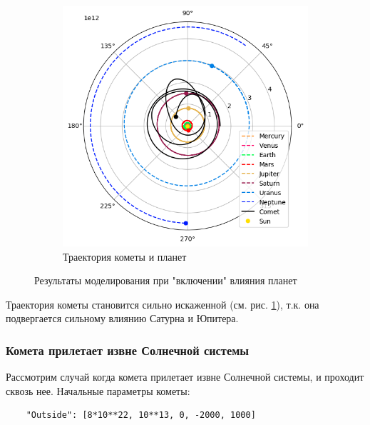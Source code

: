 \begin{figure}[H]
\begin{subfigure}{0.49\linewidth}
		\includegraphics[width=1\linewidth]{imgs_8/trj.png}
		\caption{Траектория кометы и планет}
    \end{subfigure}
    \caption{Результаты моделирования при "включении" влияния планет}
    \label{fig:default}
\end{figure}
Траектория кометы становится сильно искаженной (см. рис. \ref{fig:default}), т.к. она подвергается сильному влиянию Сатурна и Юпитера.

\subsubsection*{Комета прилетает извне Солнечной системы}
Рассмотрим случай когда комета прилетает извне Солнечной системы, и проходит сквозь нее. Начальные параметры кометы:
\begin{lstlisting}
	"Outside": [8*10**22, 10**13, 0, -2000, 1000]
\end{lstlisting}

